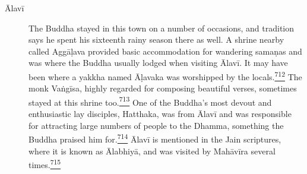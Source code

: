 \begin{description}
\item[Ālavī]
The Buddha stayed in this town on a number of occasions, and tradition
says he spent his sixteenth rainy season there as well. A shrine nearby
called Aggāḷava provided basic accommodation for wandering samaṇas and
was where the Buddha usually lodged when visiting Ālavī. It may have
been where a yakkha named Āḷavaka was worshipped by the
locals.\label{footprints_split_019.html_fnref712}\hyperref[footprints_split_025.htmlux5cux23fn712]{\textsuperscript{712}}
The monk Vaṅgīsa, highly regarded for composing beautiful verses,
sometimes stayed at this shrine
too.\label{footprints_split_019.html_fnref713}\hyperref[footprints_split_025.htmlux5cux23fn713]{\textsuperscript{713}}
One of the Buddha's most devout and enthusiastic lay disciples,
Hatthaka, was from Ālavī and was responsible for attracting large
numbers of people to the Dhamma, something the Buddha praised him
for.\label{footprints_split_019.html_fnref714}\hyperref[footprints_split_025.htmlux5cux23fn714]{\textsuperscript{714}}
Ālavī is mentioned in the Jain scriptures, where it is known as
Ālabhiyā, and was visited by Mahāvīra several
times.\label{footprints_split_019.html_fnref715}\hyperref[footprints_split_025.htmlux5cux23fn715]{\textsuperscript{715}}


\end{description}
